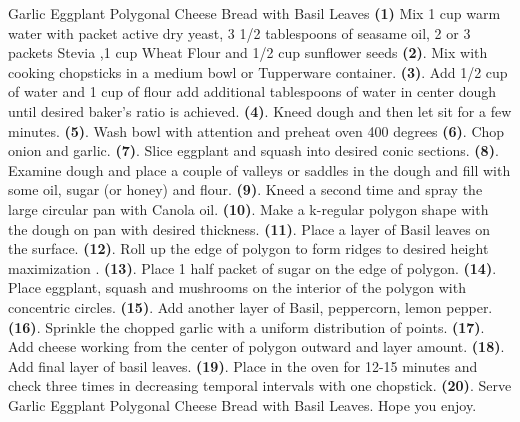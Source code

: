 \documentclass{recipecard}
\begin{document}
\vspace{8pt}
\begin{recipe}{Garlic Eggplant Polygonal Cheese Bread with Basil Leaves}{} \textbf{(1)} Mix 1 cup warm water with packet active dry yeast, 3 1/2 tablespoons of seasame oil, 2 or 3 packets Stevia ,1 cup Wheat Flour and 1/2 cup sunflower seeds \textbf{(2)}. Mix with cooking chopsticks in a medium bowl or Tupperware container.\textbf{ (3)}. Add 1/2 cup of water and 1 cup of flour add additional tablespoons of water in center dough until desired baker's ratio is achieved. \textbf{(4)}. Kneed dough and then let sit for a few minutes. \textbf{(5)}. Wash bowl with attention and preheat oven 400 degrees \textbf{(6)}. Chop onion and garlic. \textbf{(7)}. Slice eggplant and squash into desired conic sections. \textbf{(8)}. Examine dough and place a couple of valleys or saddles in the dough and fill with some oil, sugar (or honey) and flour. \textbf{(9)}. Kneed a second time and spray the large circular pan with Canola oil. \textbf{(10)}. Make a k-regular polygon shape with the dough on pan with desired thickness. \textbf{(11)}. Place a layer of Basil leaves on the surface.\textbf{ (12)}. Roll up the edge of polygon to form ridges to desired height maximization .\textbf{ (13)}. Place 1 half packet of sugar on the edge of polygon. \textbf{(14)}. Place eggplant, squash and mushrooms on the interior of the polygon with concentric circles.\textbf{ (15)}. Add another layer of Basil, peppercorn, lemon pepper. \textbf{(16)}. Sprinkle the chopped garlic with a uniform distribution of points.\textbf{ (17)}. Add cheese working from the center of polygon outward and layer amount.\textbf{ (18)}. Add final layer of basil leaves. \textbf{(19)}. Place in the oven for 12-15 minutes and check three times in decreasing temporal intervals with one chopstick.\textbf{ (20)}. Serve Garlic Eggplant Polygonal Cheese Bread with Basil Leaves. Hope you enjoy. 
\end{recipe}
\end{document}
